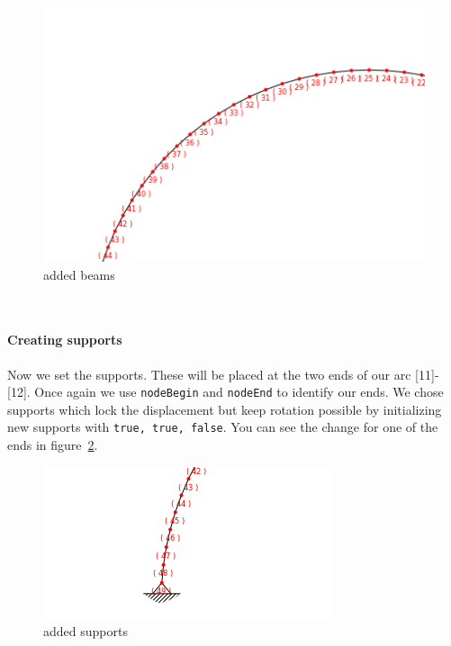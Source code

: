 \hfill
\begin{minipage}[h]{8cm}
\begin{figure}[H]
\begin{center}
\includegraphics[width=\textwidth]{../pictures/scriptbeam.png}
\caption{added beams}
\label{pic:scriptbeam}
\end{center}
\end{figure}
\end{minipage}
\vspace{20pt}\\
\begin{minipage}[h]{\textwidth-8cm}
\paragraph{Creating supports} Now we set the supports. These will be placed at the two ends of our arc [11]-[12]. Once again we use \texttt{nodeBegin} and \texttt{nodeEnd} to identify our ends. We chose supports which lock the displacement but keep rotation possible by initializing new supports with \texttt{true, true, false}. You can see the change for one of the ends in figure~\ref{pic:scriptsupport}.
\end{minipage}
\hfill
\begin{minipage}[h]{8cm}
\begin{figure}[H]
\begin{center}
\includegraphics[width=\textwidth]{../pictures/scriptsupport.png}
\caption{added supports}
\label{pic:scriptsupport}
\end{center}
\end{figure}
\end{minipage}
